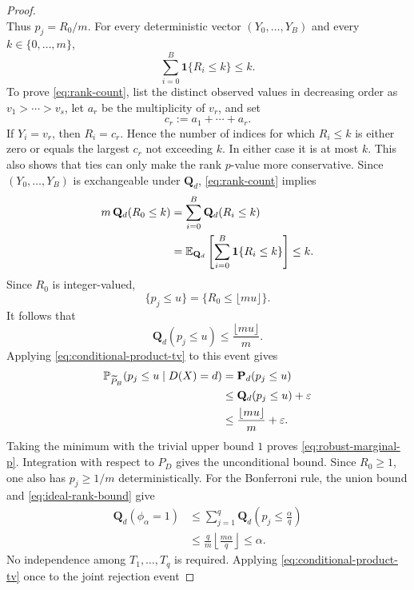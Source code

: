 \begin{proof}
\[\]
Thus \(p_j=R_0/m\).
For every deterministic vector \((Y_0,\ldots,Y_B)\) and every
\(k\in\{0,\ldots,m\}\),
\begin{equation}
\label{eq:rank-count}
\sum_{i=0}^{B}\mathbf 1\{R_i\leq k\}\leq k.
\end{equation}
To prove \eqref{eq:rank-count}, list the distinct observed values in
decreasing order as \(v_1>\cdots>v_s\), let \(a_r\) be the
multiplicity of \(v_r\), and set
\[
c_r:=a_1+\cdots+a_r.
\]
If \(Y_i=v_r\), then \(R_i=c_r\). Hence the number of indices for
which \(R_i\leq k\) is either zero or equals the largest \(c_r\) not
exceeding \(k\). In either case it is at most \(k\). This also shows
that ties can only make the rank \(p\)-value more conservative.
Since \((Y_0,\ldots,Y_B)\) is exchangeable under \(\mathbf Q_d\),
\eqref{eq:rank-count} implies
\[
\begin{aligned}
m\,\mathbf Q_d(R_0\leq k)
&=
\sum_{i=0}^{B}\mathbf Q_d(R_i\leq k) \\
&=
\mathbb{E}_{\mathbf Q_d}\left[
\sum_{i=0}^{B}\mathbf 1\{R_i\leq k\}
\right]
\leq k.
\end{aligned}
\]
Since \(R_0\) is integer-valued,
\[
\{p_j\leq u\}
=
\{R_0\leq\lfloor mu\rfloor\}.
\]
It follows that
\begin{equation}
\label{eq:ideal-rank-bound}
\mathbf Q_d(p_j\leq u)
\leq
\frac{\lfloor mu\rfloor}{m}.
\end{equation}
Applying \eqref{eq:conditional-product-tv} to this event gives
\[
\begin{aligned}
\mathbb{P}_{\widetilde P_B}(p_j\leq u\mid D(X)=d)
&=
\mathbf P_d(p_j\leq u) \\
&\leq
\mathbf Q_d(p_j\leq u)+\varepsilon \\
&\leq
\frac{\lfloor mu\rfloor}{m}+\varepsilon.
\end{aligned}
\]
Taking the minimum with the trivial upper bound \(1\) proves
\eqref{eq:robust-marginal-p}. Integration with respect to \(P_D\)
gives the unconditional bound. Since \(R_0\geq1\), one also has
\(p_j\geq1/m\) deterministically.
For the Bonferroni rule, the union bound and
\eqref{eq:ideal-rank-bound} give
\[
\begin{aligned}
\mathbf Q_d(\phi_\alpha=1)
&\leq
\sum_{j=1}^{q}
\mathbf Q_d\left(p_j\leq\frac{\alpha}{q}\right) \\
&\leq
\frac{q}{m}
\left\lfloor\frac{m\alpha}{q}\right\rfloor
\leq\alpha.
\end{aligned}
\]
No independence among \(T_1,\ldots,T_q\) is required. Applying
\eqref{eq:conditional-product-tv} once to the joint rejection event

\end{proof}

